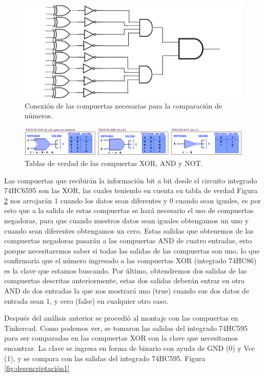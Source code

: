 \documentclass{article}
\begin{document}
\begin{figure}[h]
\includegraphics[scale=0.2]{compuertas.png}
\centering
\caption{Conexión de las compuertas necesarias para la comparación de números.}
\label{fig:compuertas}
\end{figure}

\begin{figure}[h]
\includegraphics[scale=0.8]{tablaVerdad.png}
\centering
\caption{Tablas de verdad de las compuertas XOR, AND y NOT.}
\label{fig:TablaVerdad}
\end{figure}

Las compuertas que recibirán la información bit a bit desde el circuito integrado 74HC6595 son las XOR, las cuales teniendo en cuenta su tabla de verdad Figura \ref{fig:TablaVerdad} nos arrojarán 1 cuando los datos sean diferentes y 0 cuando sean iguales, es por esto que a la salida de estas compuertas se hará necesario el uso de compuertas negadoras, para que cuando nuestros datos sean iguales obtengamos un uno y cuando sean diferentes obtengamos un cero. Estas salidas que obtenemos de las compuertas negadoras pasarán a las compuertas AND de cuatro entradas, esto porque necesitaremos saber si todas las salidas de las compuertas son uno, lo que confirmaría que el número ingresado a las compuertas XOR (integrado 74HC86) es la clave que estamos buscando. Por último, obtendremos dos salidas de las compuertas descritas anteriormente, estas dos salidas deberán entrar en otra AND de dos entradas la que nos mostrará uno (true) cuando sus dos datos de entrada sean 1, y cero (false) en cualquier otro caso. 


Después del análisis anterior se procedió al montaje con las compuertas en Tinkercad. Como podemos ver, se tomaron las salidas del integrado 74HC595 para ser comparadas en las compuertas XOR con la clave que necesitamos encontrar. La clave se ingresa en forma de binario con ayuda de GND (0) y Vcc (1), y se compara con las salidas del integrado 74HC595. Figura \ref{fig:desencriptación1}
\end{document}
